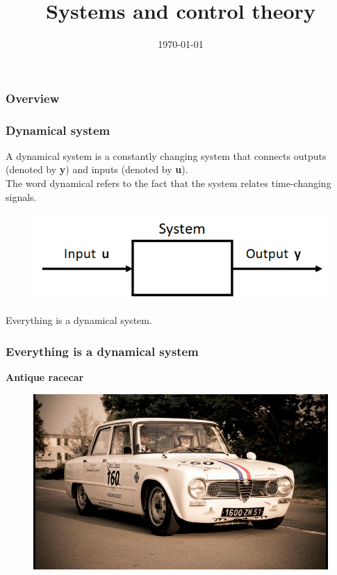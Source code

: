 \documentclass{beamer}
\title[Introduction]{Systems and control theory} %
\author{} %
\institute[KU Leuven] %
{
Katholieke Universiteit Leuven \\ %
\medskip
\textit{} %
}
\date{\today} %
\begin{document}
\begin{frame}
\titlepage %
\end{frame}

\begin{frame}
\frametitle{Overview} %
\tableofcontents %
\end{frame}


\begin{frame}
\frametitle{Dynamical system}
A dynamical system is a constantly changing system that connects outputs (denoted by \textbf y) and inputs (denoted by \textbf u).\\The word dynamical refers to the fact that the system relates time-changing signals.
\begin{figure}
\includegraphics[width=0.8\linewidth]{Dynamical_system}
\end{figure}
\medskip
Everything is a dynamical system.
\end{frame}


\begin{frame}
\frametitle{Everything is a dynamical system}
\textbf{Antique racecar}
\begin{figure}
\includegraphics[width=0.9\linewidth]{racecar}
\end{figure}
\end{frame}
\end{document}
